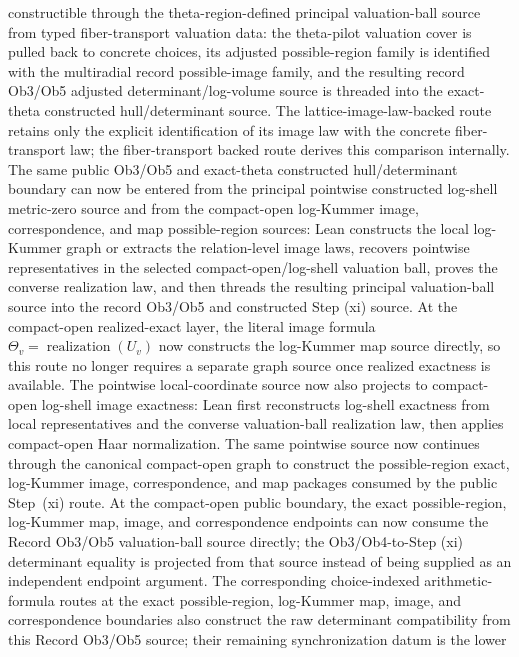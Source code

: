\begin{proposition}
  constructible through the theta-region-defined principal valuation-ball
  source from typed fiber-transport valuation data: the theta-pilot valuation
  cover is pulled back to concrete choices, its adjusted possible-region
  family is identified with the multiradial record possible-image family, and
  the resulting record Ob3/Ob5 adjusted determinant/log-volume source is
  threaded into the exact-theta constructed hull/determinant source.  The
  lattice-image-law-backed route retains only the explicit identification of
  its image law with the concrete fiber-transport law; the fiber-transport
  backed route derives this comparison internally.  The same public Ob3/Ob5
  and exact-theta constructed hull/determinant boundary can now be entered from
  the principal pointwise constructed log-shell metric-zero source and from the
  compact-open log-Kummer image, correspondence, and map possible-region
  sources: Lean constructs the local log-Kummer graph or extracts the
  relation-level image laws, recovers pointwise representatives in the selected
  compact-open/log-shell valuation ball, proves the converse realization law,
  and then threads the resulting principal valuation-ball source into the
  record Ob3/Ob5 and constructed Step (xi) source.  At the compact-open
  realized-exact layer, the literal image formula
  \(\Theta_v=\operatorname{realization}(U_v)\) now constructs the
  log-Kummer map source directly, so this route no longer requires a separate
  graph source once realized exactness is available.  The pointwise
  local-coordinate source now also projects to compact-open log-shell image
  exactness: Lean first reconstructs log-shell exactness from local
  representatives and the converse valuation-ball realization law, then
  applies compact-open Haar normalization.  The same pointwise source now
  continues through the canonical compact-open graph to construct the
  possible-region exact, log-Kummer image, correspondence, and map packages
  consumed by the public Step~(xi) route.  At the compact-open
  public boundary, the exact possible-region, log-Kummer map, image, and
  correspondence endpoints can now consume the Record Ob3/Ob5 valuation-ball
  source directly; the Ob3/Ob4-to-Step (xi) determinant equality is projected
  from that source instead of being supplied as an independent endpoint
  argument.  The corresponding choice-indexed arithmetic-formula routes at
  the exact possible-region, log-Kummer map, image, and correspondence
  boundaries also construct the raw determinant compatibility from this
  Record Ob3/Ob5 source; their remaining synchronization datum is the lower

\end{proposition}
